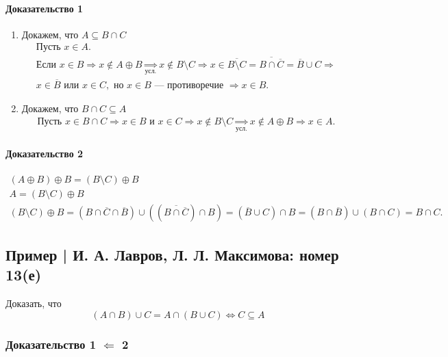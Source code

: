 \documentclass{article}
\begin{document}
\paragraph{Доказательство 1}
\begin{enumerate}
    \item Докажем, что $A \subseteq B \cap C$
    \begin{gather*}
        \text{Пусть } x \in A. \\
        \text{Если } x \in B \Rightarrow x \notin A \oplus B \underset{\text{усл.}}{\Rightarrow} 
        x \notin B \setminus C \Rightarrow x \in \overline{B \setminus C} = \overline{B \cap \overline{C}} = \overline{B} \cup C \Rightarrow \\
        x \in \overline{B} \text{ или } x \in C, \text{ но } x \in B \text{ --- противоречие } \Rightarrow x \in B.
    \end{gather*}
    \item Докажем, что $B \cap C \subseteq A$
    \begin{gather*}
    \text{Пусть } x \in B \cap C \Rightarrow x \in B \text{ и } x \in C \Rightarrow 
    x \notin B \setminus C \underset{\text{усл.}}{\Rightarrow} x \notin A \oplus B \Rightarrow x \in A.
    \end{gather*}
\end{enumerate}

\paragraph{Доказательство 2}
\begin{gather*}
    (A \oplus B) \oplus B = (B \setminus C) \oplus B \\
    A = (B \setminus C) \oplus B \\
    (B \setminus C) \oplus B = 
    (B \cap \overline{C} \cap \overline{B}) \cup \left( (\overline{B \cap \overline{C}}) \cap B \right) = 
    (\overline{B} \cup C) \cap B = 
    (B \cap \overline{B}) \cup (B \cap C) = B \cap C.
\end{gather*}


\subsection{Пример | И. А. Лавров, Л. Л. Максимова: номер 13(е)}
Доказать, что
\[
    (A \cap B) \cup C = A \cap (B \cup C) \Leftrightarrow C \subseteq A
\]

\subsubsection{Доказательство 1 $\Leftarrow$ 2}
\end{document}
